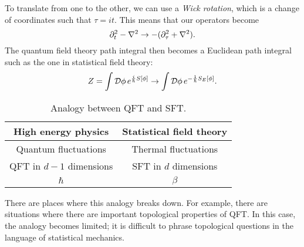 To translate from one to the other, we can use a \emph{Wick rotation}, which is a change of coordinates such that $\tau = it$. This means that our operators become
\begin{equation}
  \partial_t^2 - \laplacian \to -(\partial_\tau^2 + \laplacian).
\end{equation}
The quantum field theory path integral then becomes a Euclidean path integral such as the one in statistical field theory:
\begin{equation}
  Z = \int \mathop{\mathcal{D} \phi} e^{\frac{i}{\hbar} S[\phi]} \to \int \mathop{\mathcal{D} \phi}e^{-\frac{1}{\hbar} S_E[\phi]}.
\end{equation}

\begin{table}[htpb]
  \centering
  \begin{tabular}{|c|c|}
    \hline
    High energy physics & Statistical field theory \\
    \hline
    Quantum fluctuations & Thermal fluctuations \\
    QFT in $d-1$ dimensions & SFT in $d$ dimensions\\
    $\hbar$ & $\beta$ \\
    \hline
  \end{tabular}
  \caption{Analogy between QFT and SFT.}
  \label{tab:analogy}
\end{table}
There are places where this analogy breaks down. For example, there are situations where there are important topological properties of QFT. In this case, the analogy becomes limited; it is difficult to phrase topological questions in the language of statistical mechanics.
